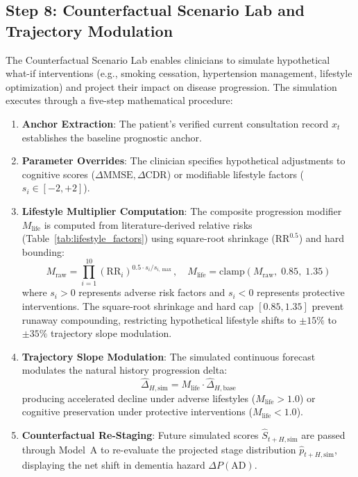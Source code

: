 \documentclass[11pt,a4paper]{article}
\begin{document}
\subsection{Step 8: Counterfactual Scenario Lab and Trajectory Modulation}
\label{sec:method_scenariolab}
The Counterfactual Scenario Lab enables clinicians to simulate hypothetical what-if interventions (e.g., smoking cessation, hypertension management, lifestyle optimization) and project their impact on disease progression. The simulation executes through a five-step mathematical procedure:
\begin{enumerate}
    \item \textbf{Anchor Extraction}: The patient's verified current consultation record $x_t$ establishes the baseline prognostic anchor.
    \item \textbf{Parameter Overrides}: The clinician specifies hypothetical adjustments to cognitive scores ($\Delta \text{MMSE}, \Delta \text{CDR}$) or modifiable lifestyle factors ($s_i \in [-2, +2]$).
    \item \textbf{Lifestyle Multiplier Computation}: The composite progression modifier $M_{\text{life}}$ is computed from literature-derived relative risks (Table~\ref{tab:lifestyle_factors}) using square-root shrinkage ($\text{RR}^{0.5}$) and hard bounding:
    \begin{equation}
        M_{\text{raw}} = \prod_{i=1}^{10} \left(\text{RR}_i\right)^{0.5 \cdot s_i / s_{i, \max}}, \quad M_{\text{life}} = \text{clamp}(M_{\text{raw}}, \; 0.85, \; 1.35)
        \label{eq:lifestyle_multiplier}
    \end{equation}
    where $s_i > 0$ represents adverse risk factors and $s_i < 0$ represents protective interventions. The square-root shrinkage and hard cap $[0.85, 1.35]$ prevent runaway compounding, restricting hypothetical lifestyle shifts to $\pm 15\%$ to $\pm 35\%$ trajectory slope modulation.
    \item \textbf{Trajectory Slope Modulation}: The simulated continuous forecast modulates the natural history progression delta:
    \begin{equation}
        \hat{\Delta}_{H, \text{sim}} = M_{\text{life}} \cdot \hat{\Delta}_{H, \text{base}}
        \label{eq:slope_mod}
    \end{equation}
    producing accelerated decline under adverse lifestyles ($M_{\text{life}} > 1.0$) or cognitive preservation under protective interventions ($M_{\text{life}} < 1.0$).
    \item \textbf{Counterfactual Re-Staging}: Future simulated scores $\hat{S}_{t+H, \text{sim}}$ are passed through Model~A to re-evaluate the projected stage distribution $\hat{p}_{t+H, \text{sim}}$, displaying the net shift in dementia hazard $\Delta P(\text{AD})$.
\end{enumerate}
\end{document}
